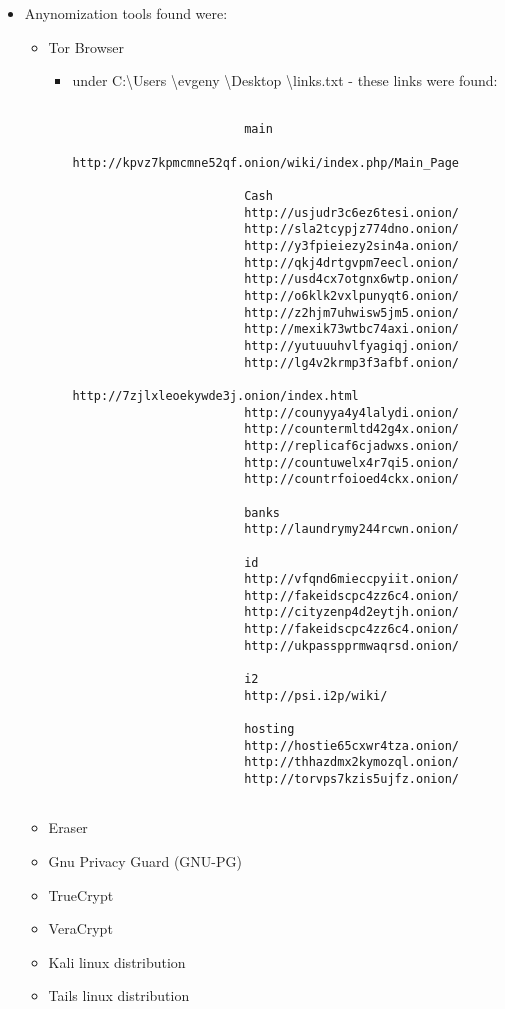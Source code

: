 \begin{enumerate}
\begin{itemize}
\begin{itemize}
\begin{itemize}
			\end{itemize}
			
		\item Anynomization tools found were:
			
				\begin{itemize}
					\item Tor Browser
					
					\begin{itemize}
						\item under C:\textbackslash Users \textbackslash evgeny \textbackslash Desktop \textbackslash links.txt - these links were found:
						\begin{lstlisting}
						
						main
						http://kpvz7kpmcmne52qf.onion/wiki/index.php/Main_Page
						
						Cash
						http://usjudr3c6ez6tesi.onion/
						http://sla2tcypjz774dno.onion/
						http://y3fpieiezy2sin4a.onion/
						http://qkj4drtgvpm7eecl.onion/
						http://usd4cx7otgnx6wtp.onion/
						http://o6klk2vxlpunyqt6.onion/
						http://z2hjm7uhwisw5jm5.onion/
						http://mexik73wtbc74axi.onion/
						http://yutuuuhvlfyagiqj.onion/
						http://lg4v2krmp3f3afbf.onion/
						http://7zjlxleoekywde3j.onion/index.html
						http://counyya4y4lalydi.onion/
						http://countermltd42g4x.onion/
						http://replicaf6cjadwxs.onion/
						http://countuwelx4r7qi5.onion/
						http://countrfoioed4ckx.onion/
						
						banks
						http://laundrymy244rcwn.onion/
						
						id
						http://vfqnd6mieccpyiit.onion/
						http://fakeidscpc4zz6c4.onion/
						http://cityzenp4d2eytjh.onion/
						http://fakeidscpc4zz6c4.onion/
						http://ukpasspprmwaqrsd.onion/
						
						i2
						http://psi.i2p/wiki/
						
						hosting
						http://hostie65cxwr4tza.onion/
						http://thhazdmx2kymozql.onion/
						http://torvps7kzis5ujfz.onion/
						
						\end{lstlisting}
						
					\end{itemize}
					
					\item Eraser
					
					\item Gnu Privacy Guard (GNU-PG)
					\item TrueCrypt
					\item VeraCrypt
					\item Kali linux distribution
					\item Tails linux distribution
					

\end{itemize}
\end{itemize}
\end{itemize}
\end{enumerate}
